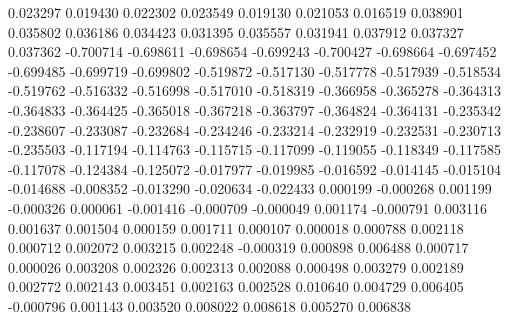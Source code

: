 0.023297
0.019430
0.022302
0.023549
0.019130
0.021053
0.016519
0.038901
0.035802
0.036186
0.034423
0.031395
0.035557
0.031941
0.037912
0.037327
0.037362
-0.700714
-0.698611
-0.698654
-0.699243
-0.700427
-0.698664
-0.697452
-0.699485
-0.699719
-0.699802
-0.519872
-0.517130
-0.517778
-0.517939
-0.518534
-0.519762
-0.516332
-0.516998
-0.517010
-0.518319
-0.366958
-0.365278
-0.364313
-0.364833
-0.364425
-0.365018
-0.367218
-0.363797
-0.364824
-0.364131
-0.235342
-0.238607
-0.233087
-0.232684
-0.234246
-0.233214
-0.232919
-0.232531
-0.230713
-0.235503
-0.117194
-0.114763
-0.115715
-0.117099
-0.119055
-0.118349
-0.117585
-0.117078
-0.124384
-0.125072
-0.017977
-0.019985
-0.016592
-0.014145
-0.015104
-0.014688
-0.008352
-0.013290
-0.020634
-0.022433
0.000199
-0.000268
0.001199
-0.000326
0.000061
-0.001416
-0.000709
-0.000049
0.001174
-0.000791
0.003116
0.001637
0.001504
0.000159
0.001711
0.000107
0.000018
0.000788
0.002118
0.000712
0.002072
0.003215
0.002248
-0.000319
0.000898
0.006488
0.000717
0.000026
0.003208
0.002326
0.002313
0.002088
0.000498
0.003279
0.002189
0.002772
0.002143
0.003451
0.002163
0.002528
0.010640
0.004729
0.006405
-0.000796
0.001143
0.003520
0.008022
0.008618
0.005270
0.006838
